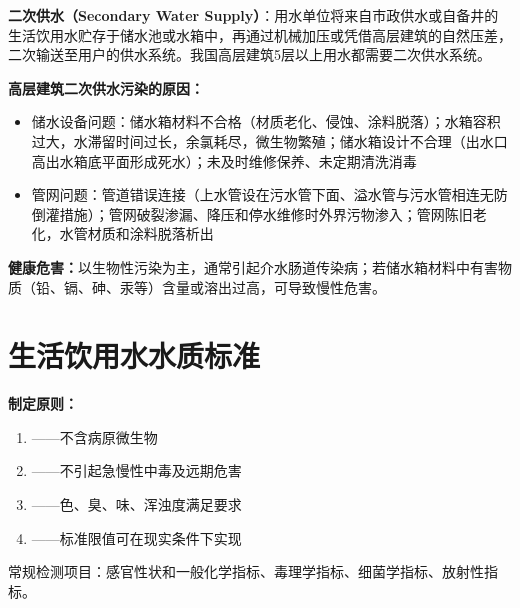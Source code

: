 \documentclass[10pt,a4paper,oneside]{ctexbook}
\begin{document}
\begin{defbox}
\textbf{二次供水（Secondary Water Supply）}：用水单位将来自市政供水或自备井的生活饮用水贮存于储水池或水箱中，再通过机械加压或凭借高层建筑的自然压差，二次输送至用户的供水系统。我国高层建筑5层以上用水都需要二次供水系统。
\end{defbox}

\begin{tipbox}
\textbf{高层建筑二次供水污染的原因：}
\begin{itemize}[leftmargin=*]
    \item 储水设备问题：储水箱材料不合格（材质老化、侵蚀、涂料脱落）；水箱容积过大，水滞留时间过长，余氯耗尽，微生物繁殖；储水箱设计不合理（出水口高出水箱底平面形成死水）；未及时维修保养、未定期清洗消毒
    \item 管网问题：管道错误连接（上水管设在污水管下面、溢水管与污水管相连无防倒灌措施）；管网破裂渗漏、降压和停水维修时外界污物渗入；管网陈旧老化，水管材质和涂料脱落析出
\end{itemize}
\textbf{健康危害：}以生物性污染为主，通常引起介水肠道传染病；若储水箱材料中有害物质（铅、镉、砷、汞等）含量或溶出过高，可导致慢性危害。
\end{tipbox}

\section{生活饮用水水质标准}

\begin{keybox}
\textbf{制定原则：}
\begin{enumerate}[leftmargin=*]
    \item {}——不含病原微生物
    \item {}——不引起急慢性中毒及远期危害
    \item {}——色、臭、味、浑浊度满足要求
    \item {}——标准限值可在现实条件下实现
\end{enumerate}
\end{keybox}

常规检测项目：感官性状和一般化学指标、毒理学指标、细菌学指标、放射性指标。
\end{document}
